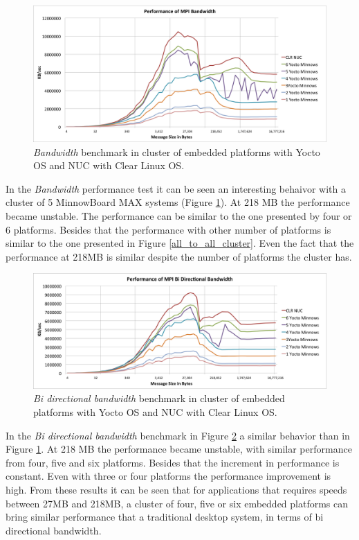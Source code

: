 \begin{figure}
  \includegraphics[width=\paperwidth]{images/mpbench_cluster_experiments/mpi_bandwidth.png}
\caption{\textit{Bandwidth} benchmark in cluster of embedded platforms with Yocto OS and NUC
with Clear Linux OS.}
\label{bandwidth_cluster}
\end{figure}

In the \textit{Bandwidth} performance test it can be seen an interesting
behaivor with a cluster of 5 MinnowBoard MAX systems (Figure
\ref{bandwidth_cluster}). At 218 MB the performance became unstable. The
performance can be similar to the one presented by four or 6 platforms. Besides
that the performance with other number of platforms is similar to the one
presented in Figure \ref{all_to_all_cluster}.  Even the fact that the
performance at 218MB is similar despite the number of platforms the cluster
has.

\begin{figure}
  \includegraphics[width=\paperwidth]{images/mpbench_cluster_experiments/mpi_bibw.png}
\caption{\textit{Bi directional bandwidth} benchmark in cluster of embedded platforms with Yocto OS and NUC
with Clear Linux OS.}
\label{bibw_cluster}
\end{figure}

In the \textit{Bi directional bandwidth} benchmark in Figure \ref{bibw_cluster}
a similar behavior than in Figure \ref{bandwidth_cluster}.  At 218 MB the
performance became unstable, with similar performance from four, five and six
platforms. Besides that the increment in performance is constant. Even with
three or four platforms the performance improvement is high. From these results
it can be seen that for applications that requires speeds between 27MB and
218MB, a cluster of four, five or six embedded platforms can bring similar
performance that a traditional desktop system, in terms of bi directional
bandwidth.

